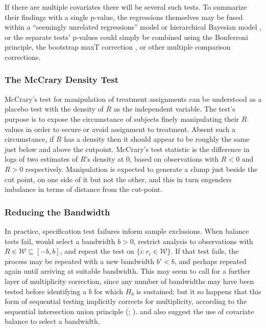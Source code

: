 If there are multiple
covariates there will be several such tests. To summarize their
findings with a single p-value, the
regressions themselves may be fused within a
``seemingly unrelated regressions'' model \citep{lee2010regression} or
hierarchical Bayesian model
\citep{liMatteiMealli2015BayesianRD}, or the
separate tests' p-values could simply be combined using the Bonferroni
principle, the bootstrap maxT correction \citep{westfall2011using}, or
other multiple comparison corrections.

\subsubsection{The McCrary Density Test}\label{sec:mccrary}
McCrary's test for manipulation of treatment assignments
\citeyearpar{mccrary2008manipulation} can be understood as a %
placebo test with the density of $R$ as the independent variable.
The test's
purpose is to expose the circumstance of subjects finely manipulating their
$R$ values in order to secure or avoid assignment to treatment.  Absent
such a circumstance, if $R$ has a density then it should appear to be
roughly the same just below and above the cutpoint.  McCrary's
\citeyearpar{mccrary2008manipulation} test statistic is the difference
in logs of two estimates of $R$'s density at 0, based on observations
with $R<0$ and $R>0$ respectively.
Manipulation is expected to generate a clump just beside the cut
point, on one side of it but not the other, and this in turn engenders
imbalance in terms of distance from the cut-point.

\subsubsection{Reducing the Bandwidth}\label{sec:bandwidth}
In practice, specification test failures inform sample exclusions.
When balance tests fail,
\citet{lee2010regression} would select a bandwidth $b>0$, restrict
analysis to observations with $R\in \mathcal{W} \subseteq [-b, b]$,
and repeat the test on $\{i : r_{i} \in \mathcal{W}\}$.
If that test fails, the process may be repeated with a new bandwidth
$b'<b$, and perhaps repeated again until arriving at suitable bandwidth.
This may seem to call for a further layer of multiplicity correction,
since any number of
bandwidths may have been tested before identifying a
$b$ for which $H_{b}$ is sustained; but it so happens that this form
of sequential testing implicitly corrects for multiplicity, according to the
sequential intersection union principle
(\citealp[SIUP;][Proposition~1]{rosenbaum2008testing};
\citealp{hansenSales2015cochran}).
\citet{liMatteiMealli2015BayesianRD} and
\citet{cattaneo2014randomization} also suggest the use of covariate
balance to select a bandwidth.

